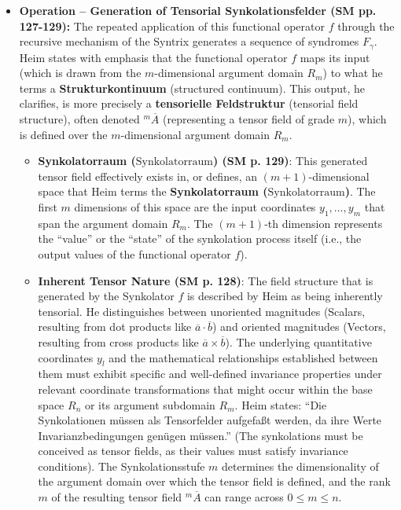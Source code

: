 \documentclass[12pt]{article}
\newcommand{\q}[1]{\enquote{#1}}
\newcommand{\syndrom}{F} %
\newcommand{\synkolatorraum}{\text{Synkolatorraum}}
\begin{document}
\begin{itemize}
    \item \textbf{Operation – Generation of Tensorial Synkolationsfelder (SM pp. 127-129):}
    The repeated application of this functional operator \( f \) through the recursive mechanism of the Syntrix generates a sequence of syndromes \( \syndrom_\gamma \). Heim states with emphasis that the functional operator \( f \) maps its input (which is drawn from the \( m \)-dimensional argument domain \( R_m \)) to what he terms a \textbf{Strukturkontinuum} (structured continuum). This output, he clarifies, is more precisely a \textbf{tensorielle Feldstruktur} (tensorial field structure), often denoted \( ^m\overline{A} \) (representing a tensor field of grade \( m \)), which is defined over the \( m \)-dimensional argument domain \( R_m \).
    \begin{itemize}
        \item \textbf{Synkolatorraum (\(\synkolatorraum\)) (SM p. 129)}: This generated tensor field effectively exists in, or defines, an \( (m+1) \)-dimensional space that Heim terms the \textbf{Synkolatorraum (\(\synkolatorraum\))}. The first \( m \) dimensions of this space are the input coordinates \(y_1, \dots, y_m\) that span the argument domain \( R_m \). The \( (m+1) \)-th dimension represents the \q{value} or the \q{state} of the synkolation process itself (i.e., the output values of the functional operator \( f \)).
        \item \textbf{Inherent Tensor Nature (SM p. 128)}: The field structure that is generated by the Synkolator \( f \) is described by Heim as being inherently tensorial. He distinguishes between unoriented magnitudes (Scalars, resulting from dot products like $\overline{a} \cdot \overline{b}$) and oriented magnitudes (Vectors, resulting from cross products like $\overline{a} \times \overline{b}$). The underlying quantitative coordinates \( y_l \) and the mathematical relationships established between them must exhibit specific and well-defined invariance properties under relevant coordinate transformations that might occur within the base space \( R_n \) or its argument subdomain \( R_m \). Heim states: \q{Die Synkolationen müssen als Tensorfelder aufgefaßt werden, da ihre Werte Invarianzbedingungen genügen müssen.} (The synkolations must be conceived as tensor fields, as their values must satisfy invariance conditions). The Synkolationsstufe \( m \) determines the dimensionality of the argument domain over which the tensor field is defined, and the rank \(m\) of the resulting tensor field \( ^m\overline{A} \) can range across $0 \le m \le n$.
    \end{itemize}


\end{itemize}
\end{document}
